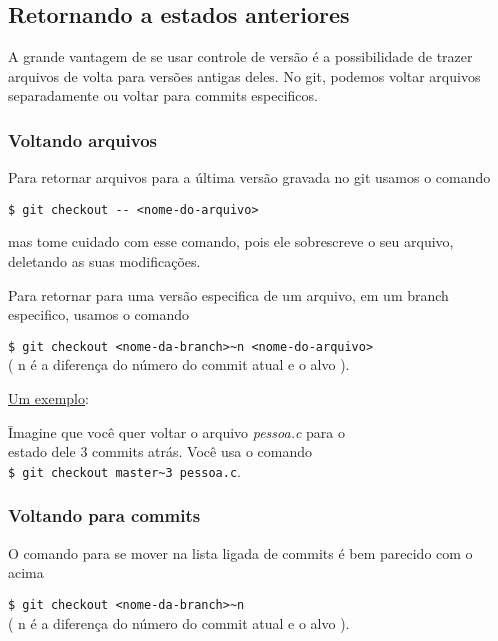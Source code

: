 \documentclass{article}
\begin{document}
\subsection{Retornando a estados anteriores}
    A grande vantagem de se usar controle de versão é a possibilidade de trazer
arquivos de volta para versões antigas deles. No git, podemos voltar arquivos
separadamente ou voltar para commits especificos.

\subsubsection{Voltando arquivos}
    Para retornar arquivos para a última versão gravada no git usamos o comando
    \begin{tabbing}
        \hspace{1cm}\=\verb#$ git checkout -- <nome-do-arquivo>#
    \end{tabbing}
mas tome cuidado com esse comando, pois ele sobrescreve o seu arquivo, deletando
as suas modificações.
    
    Para retornar para uma versão especifica de um arquivo, em um branch especifico,
usamos o comando
    \begin{tabbing}
        \hspace{1cm}\=\verb#$ git checkout <nome-da-branch>~n <nome-do-arquivo># \\
                    \>( n é  a diferença do número do commit atual e o alvo ).
    \end{tabbing}
    
    \underline{Um exemplo}:
    \begin{tabbing}
        \hspace{0.5cm}  \= Imagine que você quer voltar o arquivo \emph{pessoa.c} para o\\
                        \> estado dele 3 commits atrás. Você usa o comando\\
                        \> \verb#$ git checkout master~3 pessoa.c#.
    \end{tabbing}
    
\subsubsection{Voltando para commits}
    O comando para se mover na lista ligada de commits é bem parecido com o acima
    \begin{tabbing}
        \hspace{1cm}\=\verb#$ git checkout <nome-da-branch>~n# \\
                    \>( n é  a diferença do número do commit atual e o alvo ).
    \end{tabbing}
    
\end{document}
